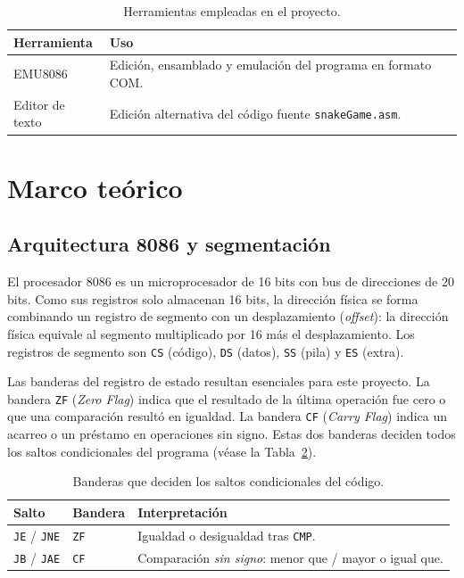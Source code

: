 \documentclass[10pt]{article}
\begin{document}
\begin{table}[ht]
\centering
\caption{Herramientas empleadas en el proyecto.}
\label{tab:herramientas}
\begin{tabular}{@{}p{3.6cm}p{9cm}@{}}
\toprule
Herramienta & Uso \\
\midrule
EMU8086 & Edición, ensamblado y emulación del programa en formato COM. \\
Editor de texto & Edición alternativa del código fuente \texttt{snakeGame.asm}. \\
\bottomrule
\end{tabular}
\end{table}

\section{Marco teórico}

\subsection{Arquitectura 8086 y segmentación}
El procesador 8086 es un microprocesador de 16 bits con bus de direcciones de 20 bits. Como sus registros solo almacenan 16 bits, la dirección física se forma combinando un registro de segmento con un desplazamiento (\emph{offset}): la dirección física equivale al segmento multiplicado por 16 más el desplazamiento. Los registros de segmento son \texttt{CS} (código), \texttt{DS} (datos), \texttt{SS} (pila) y \texttt{ES} (extra).

Las banderas del registro de estado resultan esenciales para este proyecto. La bandera \texttt{ZF} (\textit{Zero Flag}) indica que el resultado de la última operación fue cero o que una comparación resultó en igualdad. La bandera \texttt{CF} (\textit{Carry Flag}) indica un acarreo o un préstamo en operaciones sin signo. Estas dos banderas deciden todos los saltos condicionales del programa (véase la Tabla~\ref{tab:banderas}).

\begin{table}[ht]
\centering
\caption{Banderas que deciden los saltos condicionales del código.}
\label{tab:banderas}
\begin{tabular}{@{}p{3cm}p{3cm}p{7cm}@{}}
\toprule
Salto & Bandera & Interpretación \\
\midrule
\texttt{JE} / \texttt{JNE} & \texttt{ZF} & Igualdad o desigualdad tras \texttt{CMP}. \\
\texttt{JB} / \texttt{JAE} & \texttt{CF} & Comparación \emph{sin signo}: menor que / mayor o igual que. \\
\bottomrule
\end{tabular}
\end{table}
\end{document}
